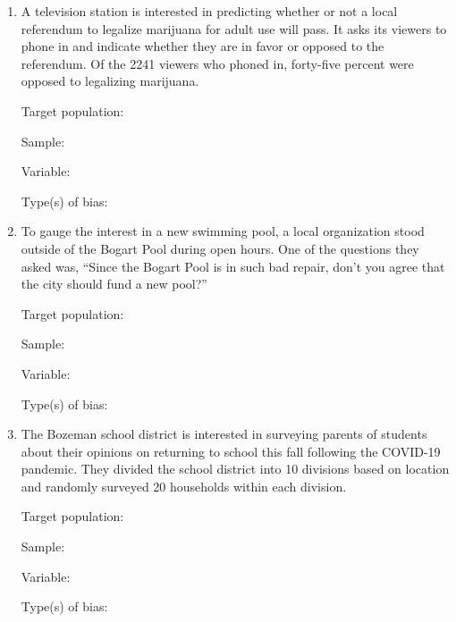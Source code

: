 \documentclass[
]{report}
\begin{document}
\begin{enumerate}
\def\labelenumi{\arabic{enumi}.}
\setcounter{enumi}{2}
\item
  A television station is interested in predicting whether or not a local referendum to legalize marijuana for adult use will pass. It asks its viewers to phone in and indicate whether they are in favor or opposed to the referendum. Of the 2241 viewers who phoned in, forty-five percent were opposed to legalizing marijuana.
  \vspace{0.1in}

  Target population:
  \vspace{0.3in}

  Sample:
  \vspace{0.3in}

  Variable:
  \vspace{0.3in}

  Type(s) of bias:
  \vspace{0.3in}
\item
  To gauge the interest in a new swimming pool, a local organization stood outside of the Bogart Pool during open hours. One of the questions they asked was, ``Since the Bogart Pool is in such bad repair, don't you agree that the city should fund a new pool?''
  \vspace{0.1in}

  Target population:
  \vspace{0.3in}

  Sample:
  \vspace{0.3in}

  Variable:
  \vspace{0.3in}

  Type(s) of bias:
  \vspace{0.3in}
\item
  The Bozeman school district is interested in surveying parents of students about their opinions on returning to school this fall following the COVID-19 pandemic. They divided the school district into 10 divisions based on location and randomly surveyed 20 households within each division.
  \vspace{0.1in}

  Target population:
  \vspace{0.3in}

  Sample:
  \vspace{0.3in}

  Variable:
  \vspace{0.3in}

  Type(s) of bias:
  \vspace{0.3in}
\end{enumerate}
\end{document}
